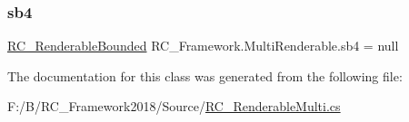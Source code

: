 \mbox{\label{class_r_c___framework_1_1_multi_renderable_a24b67c770fadae584a5d0890f5cef70b}} 
\subsubsection{\texorpdfstring{sb4}{sb4}}
{\footnotesize\ttfamily \mbox{\hyperlink{class_r_c___framework_1_1_r_c___renderable_bounded}{R\+C\+\_\+\+Renderable\+Bounded}} R\+C\+\_\+\+Framework.\+Multi\+Renderable.\+sb4 = null}



The documentation for this class was generated from the following file\+:\begin{DoxyCompactItemize}
\item 
F\+:/\+B/\+R\+C\+\_\+\+Framework2018/\+Source/\mbox{\hyperlink{_r_c___renderable_multi_8cs}{R\+C\+\_\+\+Renderable\+Multi.\+cs}}\end{DoxyCompactItemize}
